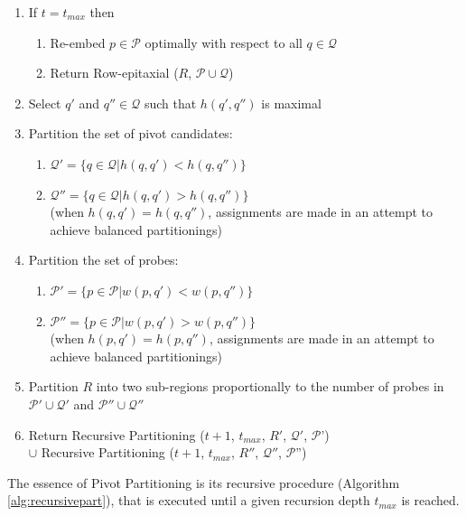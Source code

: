 \documentclass{llncs}
\begin{document}
\begin{algorithm}
\begin{minipage}{4.8in}
\begin{enumerate}
\item If $t = t_{max}$ then
  \begin{enumerate}
    \item Re-embed $p \in \mathcal{P}$ optimally with respect to all $q \in \mathcal{Q}$
    \item Return Row-epitaxial ($R$, $\mathcal{P} \cup \mathcal{Q}$)
  \end{enumerate}
\item Select $q'$ and $q'' \in \mathcal{Q}$ such that $h(q',q'')$ is maximal
\item \label{step:part_pivots} Partition the set of pivot candidates:
  \begin{enumerate}
    \item $\mathcal{Q}' = \{q \in \mathcal{Q} | h(q,q') < h(q,q'')\}$
    \item $\mathcal{Q}'' = \{q \in \mathcal{Q} | h(q,q') > h(q,q'')\}$ \\
    (when $h(q,q') = h(q,q'')$, assignments are made in an attempt to
    achieve balanced partitionings)
  \end{enumerate}
\item Partition the set of probes:
  \begin{enumerate}
    \item $\mathcal{P}' = \{p \in \mathcal{P} | w(p,q') < w(p,q'')\}$
    \item $\mathcal{P}'' = \{p \in \mathcal{P} | w(p,q') > w(p,q'')\}$ \\
    (when $h(p,q') = h(p,q'')$, assignments are made in an attempt to
    achieve balanced partitionings)
  \end{enumerate}
\item \label{step:part_r} Partition $R$ into two sub-regions proportionally to the number of probes
      in $\mathcal{P}' \cup \mathcal{Q}'$ and $\mathcal{P}'' \cup \mathcal{Q}''$
\item Return Recursive Partitioning ($t + 1$, $t_{max}$, $R'$, $\mathcal{Q}'$, $\mathcal{P}$') \\
      $\cup$ Recursive Partitioning ($t + 1$, $t_{max}$, $R''$, $\mathcal{Q}''$, $\mathcal{P}$'')
\end{enumerate}

\end{minipage}
\end{algorithm}

The essence of Pivot Partitioning is its recursive procedure
(Algorithm\,\ref{alg:recursivepart}), that is executed until a given
recursion depth $t_{max}$ is reached.
\end{document}
